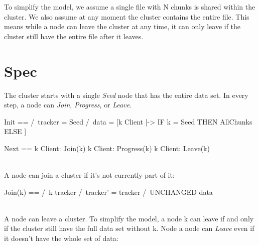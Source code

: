 To simplify the model, we assume a single file with N chunks is shared within
the cluster. We also assume at any moment the cluster contains the entire file.
This means while a node can leave the cluster at any time, it can only leave if
the cluster still have the entire file after it leaves.


\section{Spec}

The cluster starts with a single \textit{Seed} node that has the entire data
set. In every step, a node can \textit{Join}, \textit{Progress}, or
\textit{Leave}.\\

\begin{tla}
Init ==
    /\ tracker = {Seed}
    /\ data = [k \in Client |-> IF k = Seed THEN AllChunks ELSE {}]

Next ==
    \/ \E k \in Client: 
        Join(k) 
    \/ \E k \in Client: 
        Progress(k)
    \/ \E k \in Client: 
        Leave(k)
\end{tla}
\begin{tlatex}
%
%
\@pvspace{8.0pt}%
%
%
%
%
%
%
%
\end{tlatex}
\\

A node can join a cluster if it's not currently part of it:\\
\begin{tla}
Join(k) == 
    /\ k \notin tracker
    /\ tracker' = tracker 
    /\ UNCHANGED data
\end{tla}
\begin{tlatex}
%
%
%
%
\end{tlatex}
\\

A node can leave a cluster. To simplify the model, a node k can leave if and
only if the cluster still have the full data set without k. Node a node can
\textit{Leave} even if it doesn't have the whole set of data:\\

